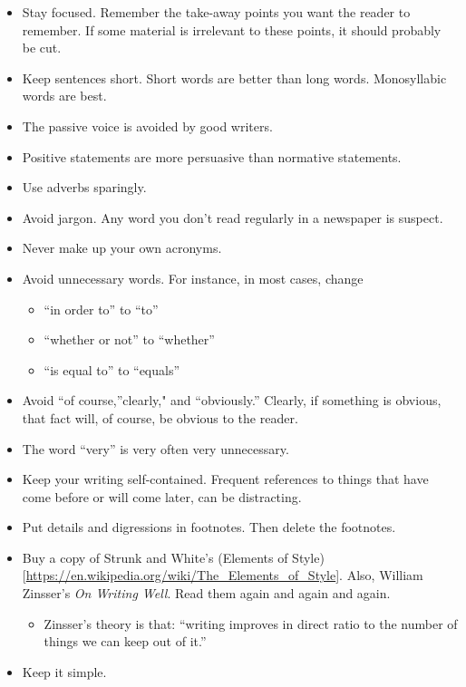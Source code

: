 \documentclass[]{book}
\providecommand{\tightlist}{%
  \setlength{\itemsep}{0pt}\setlength{\parskip}{0pt}}
\theoremstyle{definition}
\theoremstyle{definition}
\theoremstyle{definition}
\theoremstyle{remark}
\begin{document}
\begin{itemize}
\tightlist
\item
  Stay focused. Remember the take-away points you want the reader to remember. If some material is irrelevant to these points, it should probably be cut.
\item
  Keep sentences short. Short words are better than long words. Monosyllabic words are best.
\item
  The passive voice is avoided by good writers.
\item
  Positive statements are more persuasive than normative statements.
\item
  Use adverbs sparingly.
\item
  Avoid jargon. Any word you don't read regularly in a newspaper is suspect.
\item
  Never make up your own acronyms.
\item
  Avoid unnecessary words. For instance, in most cases, change

  \begin{itemize}
  \tightlist
  \item
    ``in order to'' to ``to''
  \item
    ``whether or not'' to ``whether''
  \item
    ``is equal to'' to ``equals''
  \end{itemize}
\item
  Avoid ``of course,''clearly," and ``obviously.'' Clearly, if something is obvious, that fact will, of course, be obvious to the reader.
\item
  The word ``very'' is very often very unnecessary.
\item
  Keep your writing self-contained. Frequent references to things that have come before or will come later, can be distracting.
\item
  Put details and digressions in footnotes. Then delete the footnotes.
\item
  Buy a copy of Strunk and White's (Elements of Style){[}\url{https://en.wikipedia.org/wiki/The_Elements_of_Style}{]}. Also, William Zinsser's \emph{On Writing Well}. Read them again and again and again.

  \begin{itemize}
  \tightlist
  \item
    Zinsser's theory is that: ``writing improves in direct ratio to the number of things we can keep out of it.''
  \end{itemize}
\item
  Keep it simple.
\end{itemize}
\end{document}
